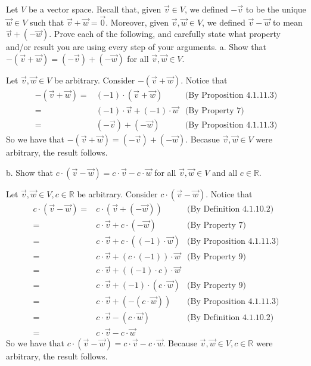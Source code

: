 \documentclass[12pt]{article}
\newenvironment{problem}[2][Problem]
{
	\begin{trivlist} 
		\item[\hskip \labelsep {\bfseries #1 #2:}]
	}
{
	\end{trivlist}
	}
\newenvironment{solution}[1][Solution]
{
	\begin{trivlist} 
		\item[\hskip \labelsep {\itshape #1:}]
	}
	{
	\end{trivlist}
}
\begin{document}
\newpage
\begin{problem}{4}
Let $V$ be a vector space. Recall that, given $\vec{v} \in V$, we defined $-\vec{v}$ to be the unique $\vec{w} \in V$ such that $\vec{v} + \vec{w} = \vec{0}$. Moreover, given $\vec{v}, \vec{w} \in V$, we defined $\vec{v}-\vec{w}$ to mean $\vec{v}+(-\vec{w})$. Prove each of the following, and carefully state what property and/or result you are using every step of your arguments.
\noindent
\newline
\newline
a. Show that $-(\vec{v}+\vec{w})=(-\vec{v})+(-\vec{w})$ for all $\vec{v},\vec{w}\in V$.
\begin{solution}
Let $\vec{v},\vec{w} \in V$ be arbitrary. Consider $-(\vec{v}+\vec{w})$. Notice that
\begin{align*}
-(\vec{v}+\vec{w}) =& (-1)\cdot (\vec{v} + \vec{w}) & \text{(By Proposition 4.1.11.3)}\\ 
=& (-1)\cdot \vec{v} + (-1) \cdot \vec{w} & \text{(By Property 7)} \\
=& (-\vec{v}) + (-\vec{w}) & \text{(By Proposition 4.1.11.3)}
\end{align*}
So we have that $-(\vec{v}+\vec{w})=(-\vec{v})+(-\vec{w})$. Becasue $\vec{v},\vec{w} \in V$ were arbitrary, the result follows.
\end{solution}
\noindent
\newline
\newline
b. Show that $c\cdot (\vec{v}-\vec{w})=c\cdot\vec{v}-c\cdot\vec{w}$ for all $\vec{v},\vec{w}\in V$ and all $c\in\mathbb{R}$.
\begin{solution}
Let $\vec{v},\vec{w} \in V, c\in\mathbb{R}$ be arbitrary. Consider $c\cdot (\vec{v}-\vec{w})$. Notice that
\begin{align*}
c\cdot (\vec{v}-\vec{w}) =& c\cdot (\vec{v} + (-\vec{w})) & \text{(By Definition 4.1.10.2)}\\
=& c\cdot \vec{v} + c\cdot (-\vec{w}) & \text{(By Property 7)} \\
=& c\cdot \vec{v} + c\cdot ((-1)\cdot \vec{w}) & \text{(By Proposition 4.1.11.3)}\\
=& c\cdot \vec{v} + (c\cdot (-1)) \cdot \vec{w} &\text{(By Property 9)}\\
=&  c\cdot \vec{v} + ((-1)\cdot c) \cdot \vec{w} &\\
=&  c\cdot \vec{v} + (-1)\cdot (c \cdot \vec{w}) &\text{(By Property 9)}\\
=& c\cdot \vec{v} +(-(c\cdot \vec{w})) & \text{(By Proposition 4.1.11.3)}\\
=& c\cdot \vec{v} -(c\cdot \vec{w}) & \text{(By Definition 4.1.10.2)}\\
=&c\cdot\vec{v}-c\cdot\vec{w} &
\end{align*}
So we have that $c\cdot (\vec{v}-\vec{w})=c\cdot\vec{v}-c\cdot\vec{w}$. Because $\vec{v},\vec{w} \in V,c \in \mathbb{R}$ were arbitrary, the result follows.
\end{solution}
\end{problem}
\end{document}
